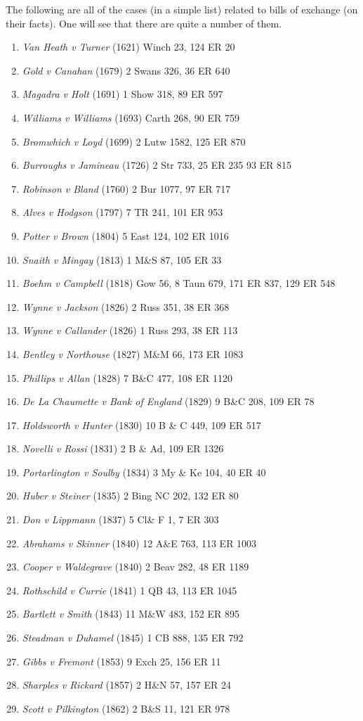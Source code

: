 \documentclass[twoside]{article}
\begin{document}
The following are all of the cases (in a simple list) related to bills of exchange (on their facts). One will see that there are quite a number of them.
\\ 
\begin{enumerate}
\item{\textit{Van Heath v Turner} (1621) Winch 23, 124 ER 20}
\item{\textit{Gold v Canahan} (1679) 2 Swans 326, 36 ER 640}
\item{\textit{Magadra v Holt} (1691) 1 Show 318, 89 ER 597}
\item{\textit{Williams v Williams} (1693) Carth 268, 90 ER 759}
\item{\textit{Bromwhich v Loyd} (1699) 2 Lutw 1582, 125 ER 870}
\item{\textit{Burroughs v Jamineau} (1726) 2 Str 733, 25 ER 235 93 ER 815}
\item{\textit{Robinson v Bland} (1760) 2 Bur 1077, 97 ER 717}
\item{\textit{Alves v Hodgson} (1797) 7 TR 241, 101 ER 953}
\item{\textit{Potter v Brown} (1804) 5 East 124, 102 ER 1016}
\item{\textit{Snaith v Mingay} (1813) 1 M\&S 87, 105 ER 33}
\item{\textit{Boehm v Campbell} (1818) Gow 56, 8 Taun 679, 171 ER 837, 129 ER 548}
\item{\textit{Wynne v Jackson} (1826) 2 Russ 351, 38 ER 368}
\item{\textit{Wynne v Callander} (1826) 1 Russ 293, 38 ER 113}
\item{\textit{Bentley v Northouse} (1827) M\&M 66, 173 ER 1083}
\item{\textit{Phillips v Allan} (1828) 7 B\&C 477, 108 ER 1120}
\item{\textit{De La Chaumette v Bank of England} (1829) 9 B\&C 208, 109 ER 78}
\item{\textit{Holdsworth v Hunter} (1830) 10 B \& C 449, 109 ER 517}
\item{\textit{Novelli v Rossi} (1831) 2 B \& Ad, 109 ER 1326}
\item{\textit{Portarlington v Soulby} (1834) 3 My \& Ke 104, 40 ER 40}
\item{\textit{Huber v Steiner} (1835) 2 Bing NC 202, 132 ER 80}
\item{\textit{Don v Lippmann} (1837) 5 Cl\& F 1, 7 ER 303}
\item{\textit{Abrahams v Skinner} (1840) 12 A\&E 763, 113 ER 1003}
\item{\textit{Cooper v Waldegrave} (1840) 2 Beav 282, 48 ER 1189}
\item{\textit{Rothschild v Currie} (1841) 1 QB 43, 113 ER 1045}
\item{\textit{Bartlett v Smith} (1843) 11 M\&W 483, 152 ER 895}
\item{\textit{Steadman v Duhamel} (1845) 1 CB 888, 135 ER 792}
\item{\textit{Gibbs v Fremont} (1853) 9 Exch 25, 156 ER 11}
\item{\textit{Sharples v Rickard} (1857) 2 H\&N 57, 157 ER 24}
\item{\textit{Scott v Pilkington} (1862) 2 B\&S 11, 121 ER 978}
\end{enumerate}
\end{document}
